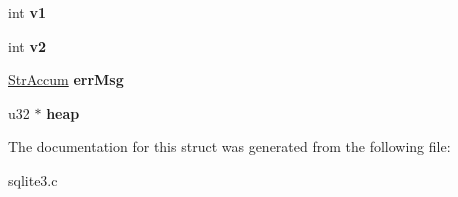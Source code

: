 \begin{DoxyCompactItemize}
\item 
int {\bfseries v1}\hypertarget{structIntegrityCk_a94edb493175bd0c1862efbaeaff63be3}{}\label{structIntegrityCk_a94edb493175bd0c1862efbaeaff63be3}

\item 
int {\bfseries v2}\hypertarget{structIntegrityCk_a0dd13b39fb4fd4e42de8ebf05af5c287}{}\label{structIntegrityCk_a0dd13b39fb4fd4e42de8ebf05af5c287}

\item 
\hyperlink{structStrAccum}{Str\+Accum} {\bfseries err\+Msg}\hypertarget{structIntegrityCk_a1e9b79bb1d7b22a840001333200a950e}{}\label{structIntegrityCk_a1e9b79bb1d7b22a840001333200a950e}

\item 
u32 $\ast$ {\bfseries heap}\hypertarget{structIntegrityCk_aada31529ac9fd90643f22cbb79cd916a}{}\label{structIntegrityCk_aada31529ac9fd90643f22cbb79cd916a}

\end{DoxyCompactItemize}


The documentation for this struct was generated from the following file\+:\begin{DoxyCompactItemize}
\item 
sqlite3.\+c\end{DoxyCompactItemize}
